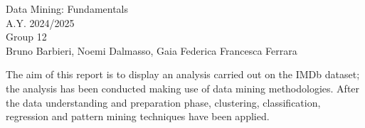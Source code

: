 \documentclass[11pt,openany]{report}
\begin{document}
\pagestyle{empty}         %
\begin{center}  
     {\LARGE { Data Mining: Fundamentals}}\\
     \vspace{2cm}
    {\Large { A.Y. 2024/2025 }}\\
    \vspace{2cm}
    {\Large { Group 12 }}\\
     \vspace{2cm}
     {\large { Bruno Barbieri, Noemi Dalmasso, Gaia Federica Francesca Ferrara }}
\end{center}

The aim of this report is to display an analysis carried out on the IMDb dataset; the analysis has been conducted making use of data mining methodologies. 
After the data understanding and preparation phase, clustering, classification, regression and pattern mining techniques have been applied.


  


\clearpage

\tableofcontents
\clearpage

\setcounter{page}{1}    %
\pagestyle{scrplain}    %
\end{document}
